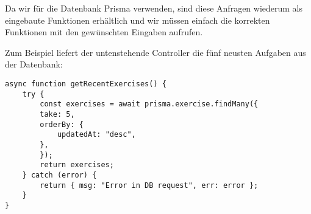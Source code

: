 Da wir für die Datenbank Prisma verwenden, sind diese Anfragen wiederum als eingebaute Funktionen erhältlich und wir müssen einfach die korrekten Funktionen mit den gewünschten Eingaben aufrufen. 

Zum Beispiel liefert der untenstehende Controller die fünf neusten Aufgaben aus der Datenbank:

\newpage
\begin{lstlisting}
async function getRecentExercises() {
    try {
        const exercises = await prisma.exercise.findMany({
        take: 5,
        orderBy: {
            updatedAt: "desc",
        },
        });
        return exercises;
    } catch (error) {
        return { msg: "Error in DB request", err: error };
    }
}
\end{lstlisting}


